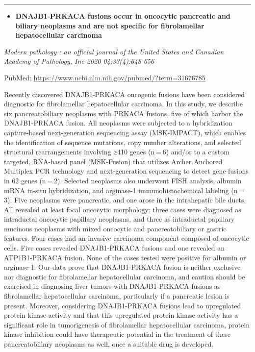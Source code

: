 \documentclass[
]{article}
\providecommand{\tightlist}{%
  \setlength{\itemsep}{0pt}\setlength{\parskip}{0pt}}
\begin{document}
\begin{center}\rule{0.5\linewidth}{0.5pt}\end{center}

\begin{itemize}
\tightlist
\item
  \textbf{DNAJB1-PRKACA fusions occur in oncocytic pancreatic and
  biliary neoplasms and are not specific for fibrolamellar
  hepatocellular carcinoma}
\end{itemize}

\emph{Modern pathology : an official journal of the United States and
Canadian Academy of Pathology, Inc 2020 04;33(4):648-656}

PubMed: \url{https://www.ncbi.nlm.nih.gov/pubmed/?term=31676785}

Recently discovered DNAJB1-PRKACA oncogenic fusions have been considered
diagnostic for fibrolamellar hepatocellular carcinoma. In this study, we
describe six pancreatobiliary neoplasms with PRKACA fusions, five of
which harbor the DNAJB1-PRKACA fusion. All neoplasms were subjected to a
hybridization capture-based next-generation sequencing assay
(MSK-IMPACT), which enables the identification of sequence mutations,
copy number alterations, and selected structural rearrangements
involving ≥410 genes (n = 6) and/or to a custom targeted, RNA-based
panel (MSK-Fusion) that utilizes Archer Anchored Multiplex PCR
technology and next-generation sequencing to detect gene fusions in 62
genes (n = 2). Selected neoplasms also underwent FISH analysis, albumin
mRNA in-situ hybridization, and arginase-1 immunohistochemical labeling
(n = 3). Five neoplasms were pancreatic, and one arose in the
intrahepatic bile ducts. All revealed at least focal oncocytic
morphology: three cases were diagnosed as intraductal oncocytic
papillary neoplasms, and three as intraductal papillary mucinous
neoplasms with mixed oncocytic and pancreatobiliary or gastric features.
Four cases had an invasive carcinoma component composed of oncocytic
cells. Five cases revealed DNAJB1-PRKACA fusions and one revealed an
ATP1B1-PRKACA fusion. None of the cases tested were positive for albumin
or arginase-1. Our data prove that DNAJB1-PRKACA fusion is neither
exclusive nor diagnostic for fibrolamellar hepatocellular carcinoma, and
caution should be exercised in diagnosing liver tumors with
DNAJB1-PRKACA fusions as fibrolamellar hepatocellular carcinoma,
particularly if a pancreatic lesion is present. Moreover, considering
DNAJB1-PRKACA fusions lead to upregulated protein kinase activity and
that this upregulated protein kinase activity has a significant role in
tumorigenesis of fibrolamellar hepatocellular carcinoma, protein kinase
inhibition could have therapeutic potential in the treatment of these
pancreatobiliary neoplasms as well, once a suitable drug is developed.
\end{document}
